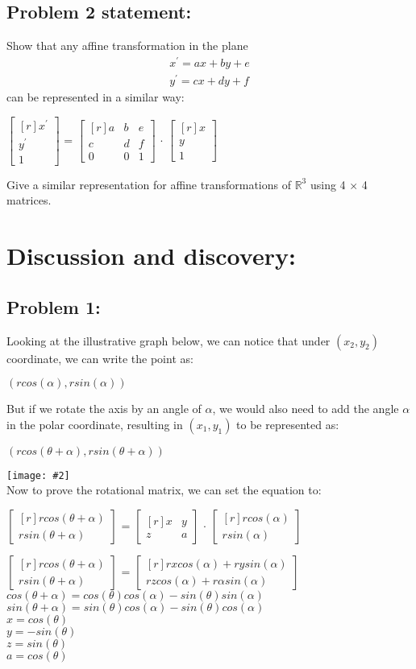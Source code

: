 \documentclass[11pt]{article}
\newcommand{\image}[2]{\texttt{[image: \#2]}}
\newcommand{\mat}[1]{
    $\begin{bmatrix*}[r]
        #1
    \end{bmatrix*}$
} %
\newcommand{\myalign}[1]{\begin{align*}#1\end{align*}}
\newcommand{\gap}{\vspace*{0.5cm}}
\begin{document}
\subsection*{Problem 2 statement:}
Show that any affine transformation in the plane
\myalign{
  x^{'} = ax + by + e \\
  y^{'} = cx + dy + f
}
can be represented in a similar way:
\begin{center}
  \mat{
    x^{'} \\
    y^{'} \\
    1
  } = \mat{
    a & b & e \\
    c & d & f \\
    0 & 0 & 1
  } $\cdot$ \mat{
    x \\
    y \\
    1
  }
\end{center}
Give a similar representation for affine transformations of $\mathbb{R}^3$ using 4 × 4 matrices.

\section{Discussion and discovery:}
\subsection{Problem 1:}
Looking at the illustrative graph below, we can notice that under $(x_2, y_2)$ coordinate, we can write
the point as:
\begin{center}
  $(rcos(\alpha), rsin(\alpha))$
\end{center}
But if we rotate the axis by an angle of $\alpha$, we would also need to add the angle $\alpha$ in the polar coordinate, resulting in $(x_1, y_1)$ to be represented as:
\begin{center}
  $(rcos(\theta + \alpha), rsin(\theta + \alpha))$
\end{center}
\image{0.22}{img3} \\
Now to prove the rotational matrix, we can set the equation to:
\begin{center}
  \mat{
    rcos(\theta + \alpha) \\
    rsin(\theta + \alpha)
  } = \mat{
    x & y \\
    z & a
  } $\cdot$ \mat{
    rcos(\alpha) \\
    rsin(\alpha)
  } \\
  \gap
  \mat{
    rcos(\theta + \alpha) \\
    rsin(\theta + \alpha)
  } = \mat{
    rxcos(\alpha) + rysin(\alpha) \\
    rzcos(\alpha) + r\alpha sin(\alpha)
  } \\
  \gap
  $cos(\theta + \alpha) = cos(\theta)cos(\alpha)-sin(\theta)sin(\alpha)$ \\
  $sin(\theta + \alpha) = sin(\theta)cos(\alpha)-sin(\theta)cos(\alpha)$ \\
  $x = cos(\theta)$ \\
  $y = -sin(\theta)$ \\
  $z = sin(\theta)$ \\
  $a = cos(\theta)$ \\
\end{center}
\end{document}
